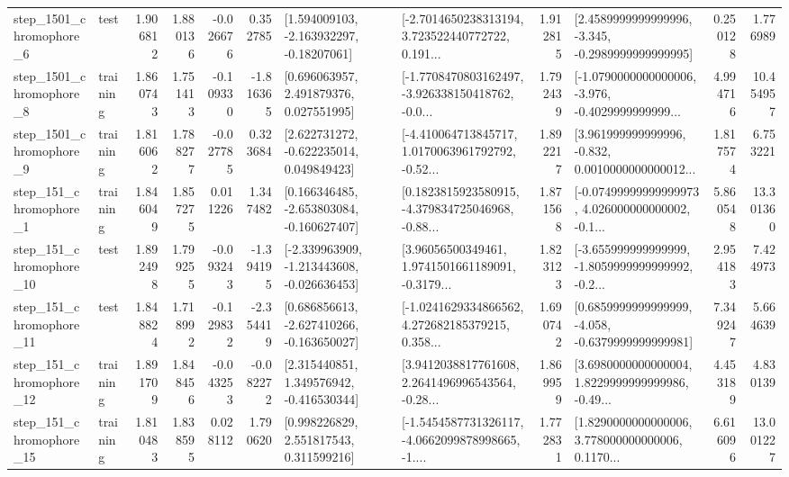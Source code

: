 \begin{tabular}{llrrrrllrlrr}
  step\_1501\_chromophore\_6 &      test &      1.906812 &    1.880136 &     -0.026676 &  0.352785 &    [1.594009103, -2.163932297, -0.18207061] &  [-2.7014650238313194, 3.723522440772722, 0.191... &       1.912815 &  [2.4589999999999996, -3.345, -0.2989999999999995] &            0.250128 &          1.776989 \\
  step\_1501\_chromophore\_8 &  training &      1.860743 &    1.751413 &     -0.109330 & -1.816365 &     [0.696063957, 2.491879376, 0.027551995] &  [-1.7708470803162497, -3.926338150418762, -0.0... &       1.792439 &  [-1.0790000000000006, -3.976, -0.4029999999999... &            4.994716 &         10.454957 \\
  step\_1501\_chromophore\_9 &  training &      1.816062 &    1.788277 &     -0.027785 &  0.323684 &    [2.622731272, -0.622235014, 0.049849423] &  [-4.410064713845717, 1.0170063961792792, -0.52... &       1.892217 &  [3.961999999999996, -0.832, 0.0010000000000012... &            1.817574 &          6.753221 \\
   step\_151\_chromophore\_1 &  training &      1.846049 &    1.857275 &      0.011226 &  1.347482 &   [0.166346485, -2.653803084, -0.160627407] &  [0.1823815923580915, -4.379834725046968, -0.88... &       1.871568 &  [-0.07499999999999973, 4.026000000000002, -0.1... &            5.860548 &         13.301360 \\
  step\_151\_chromophore\_10 &      test &      1.892498 &    1.799255 &     -0.093243 & -1.394195 &  [-2.339963909, -1.213443608, -0.026636453] &  [3.96056500349461, 1.9741501661189091, -0.3179... &       1.823123 &  [-3.655999999999999, -1.8059999999999992, -0.2... &            2.954183 &          7.424973 \\
  step\_151\_chromophore\_11 &      test &      1.848824 &    1.718992 &     -0.129832 & -2.354419 &   [0.686856613, -2.627410266, -0.163650027] &  [-1.0241629334866562, 4.272682185379215, 0.358... &       1.690742 &  [0.6859999999999999, -4.058, -0.6379999999999981] &            7.349247 &          5.664639 \\
  step\_151\_chromophore\_12 &  training &      1.891709 &    1.848456 &     -0.043253 & -0.082272 &    [2.315440851, 1.349576942, -0.416530344] &  [3.9412038817761608, 2.2641496996543564, -0.28... &       1.869959 &  [3.6980000000000004, 1.8229999999999986, -0.49... &            4.453189 &          4.830139 \\
  step\_151\_chromophore\_15 &  training &      1.810483 &    1.838595 &      0.028112 &  1.790620 &     [0.998226829, 2.551817543, 0.311599216] &  [-1.5454587731326117, -4.0662099878998665, -1.... &       1.772831 &  [1.8290000000000006, 3.778000000000006, 0.1170... &            6.616096 &         13.001227 \\

\end{tabular}
